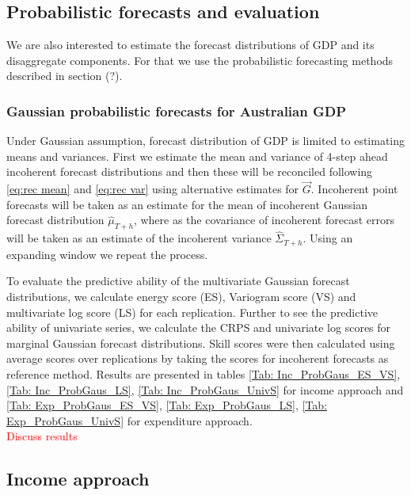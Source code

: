 \documentclass[graybox]{svmult}
\begin{document}
\subsection{Probabilistic forecasts and evaluation}

We are also interested to estimate the forecast distributions of GDP and its disaggregate components. For that we use the probabilistic forecasting methods described in section (?).

\subsubsection{Gaussian probabilistic forecasts for Australian GDP}

Under Gaussian assumption, forecast distribution of GDP is limited to estimating means and variances. First we estimate the mean and variance of 4-step ahead incoherent forecast distributions and then these will be reconciled following \ref{eq:rec mean} and \ref{eq:rec var} using alternative estimates for $\vec{G}$. Incoherent point forecasts will be taken as an estimate for the mean of incoherent Gaussian forecast distribution $\hat{\mu}_{T+h}$, where as the covariance of incoherent forecast errors will be taken as an estimate of the incoherent variance $\hat{\Sigma}_{T+h}$. Using an expanding window we repeat the process.

To evaluate the predictive ability of the multivariate Gaussian forecast distributions, we calculate energy score (ES), Variogram score (VS) and multivariate log score (LS) for each replication. Further to see the predictive ability of univariate series, we calculate the CRPS and univariate log scores for marginal Gaussian forecast distributions. Skill scores were then calculated using average scores over replications by taking the scores for incoherent forecasts as reference method. Results are presented in tables \ref{Tab: Inc_ProbGaus_ES_VS}, \ref{Tab: Inc_ProbGaus_LS}, \ref{Tab: Inc_ProbGaus_UnivS} for income approach and \ref{Tab: Exp_ProbGaus_ES_VS}, \ref{Tab: Exp_ProbGaus_LS}, \ref{Tab: Exp_ProbGaus_UnivS} for expenditure approach. \\

\textcolor{red}{Discuss results}


\subsection*{Income approach}
\end{document}

